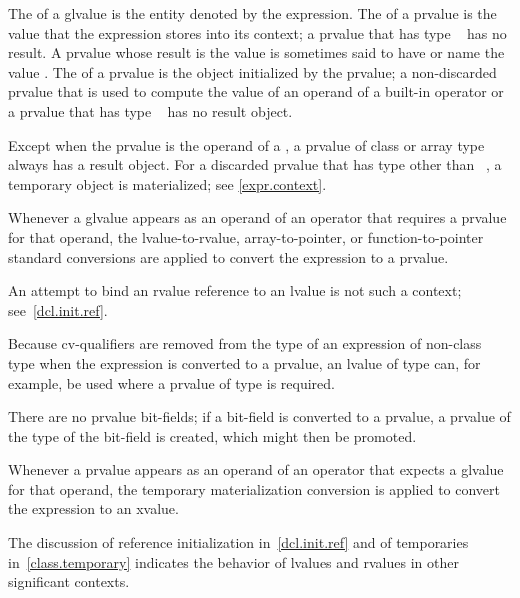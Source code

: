 \pnum
The  of a glvalue is the entity denoted by the expression.
The  of a prvalue
is the value that the expression stores into its context;
a prvalue that has type \cv{}~ has no result.
A prvalue whose result is the value 
is sometimes said to have or name the value .
The  of a prvalue is the object initialized by the prvalue;
a non-discarded prvalue
that is used to compute the value of an operand of a built-in operator
or a prvalue that has type \cv{}~
has no result object.
\begin{note}
Except when the prvalue is the operand of a ,
a prvalue of class or array type always has a result object.
For a discarded prvalue that has type other than \cv{}~,
a temporary object is materialized; see \ref{expr.context}.
\end{note}

\pnum
Whenever a glvalue appears as an operand of an operator that
requires a prvalue for that operand, the
lvalue-to-rvalue, array-to-pointer,
or function-to-pointer standard conversions are
applied to convert the expression to a prvalue.
\begin{note}
An attempt to bind an rvalue reference to an lvalue is not such a context; see~\ref{dcl.init.ref}.
\end{note}
\begin{note}
Because cv-qualifiers are removed from the type of an expression of
non-class type when the expression is converted to a prvalue, an lvalue
of type  can, for example, be used where
a prvalue of type  is required.
\end{note}
\begin{note}
There are no prvalue bit-fields; if a bit-field is converted to a
prvalue, a prvalue of the type of the bit-field is
created, which might then be promoted.
\end{note}

\pnum
Whenever a prvalue appears as an operand of an operator that
expects a glvalue for that operand, the
temporary materialization conversion is
applied to convert the expression to an xvalue.

\pnum
The discussion of reference initialization in~\ref{dcl.init.ref} and of
temporaries in~\ref{class.temporary} indicates the behavior of lvalues
and rvalues in other significant contexts.

